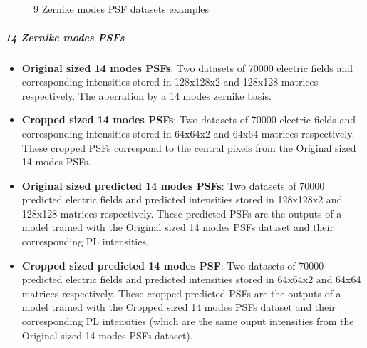 			\begin{figure*}[ht!]
				\centering
				\\
					
				\\
					
				\\
					
				\\
			
			\caption{9 Zernike modes PSF datasets examples}
		\end{figure*}
			\FloatBarrier
			
			
			\subparagraph{14 Zernike modes PSFs}
			\begin{itemize}
				\item \textbf{Original sized 14 modes PSFs}: Two datasets of 70000 electric fields and corresponding intensities stored in 128x128x2 and 128x128 matrices respectively. The aberration by a 14 modes zernike basis.
				\item \textbf{Cropped sized 14 modes PSFs}:  Two datasets of 70000 electric fields and corresponding intensities stored in 64x64x2 and 64x64 matrices respectively. These cropped  PSFs correspond to the central pixels from the Original sized 14 modes PSFs.
				\item \textbf{Original sized predicted 14 modes PSFs}:  Two datasets of 70000 predicted electric fields and predicted intensities stored in 128x128x2 and 128x128 matrices respectively. These predicted PSFs are the outputs of a model trained with the Original sized 14 modes PSFs dataset and their corresponding PL intensities.
				\item \textbf{Cropped sized predicted 14 modes PSF}: Two datasets of 70000 predicted electric fields and predicted intensities stored in 64x64x2 and 64x64 matrices respectively. These cropped predicted PSFs are the outputs of a model trained with the Cropped sized 14 modes PSFs dataset and their corresponding PL intensities (which are the same ouput intensities from the Original sized 14 modes PSFs dataset).
			\end{itemize}
			
